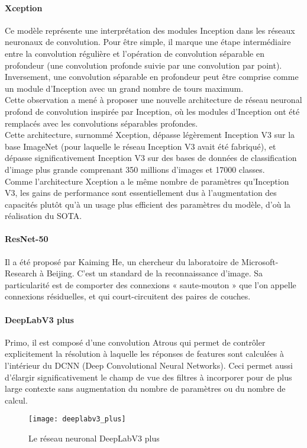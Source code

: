 \documentclass[
10pt, %
a4paper, %
oneside, %
headinclude,footinclude, %
]{scrartcl}
\begin{document}
\paragraph{Xception}
Ce modèle représente une interprétation des modules Inception dans les réseaux neuronaux de convolution. Pour être simple, il marque une étape intermédiaire entre la convolution régulière et l’opération de convolution séparable en profondeur\cite{cho2017xception} (une convolution profonde suivie par une convolution par point).
\\
Inversement, une convolution séparable en profondeur peut être comprise comme un module d’Inception avec un grand nombre de tours maximum.
\\
Cette observation a mené à proposer une nouvelle architecture de réseau neuronal profond de convolution inspirée par Inception, où les modules d’Inception ont été remplacés avec les convolutions séparables profondes.
\\
Cette architecture, surnommé Xception, dépasse légèrement Inception V3 sur la base ImageNet (pour laquelle le réseau Inception V3 avait été fabriqué), et dépasse significativement Inception V3 sur des bases de données de classification d’image plus grande comprenant 350 millions d’images et 17000 classes.
\\
Comme l’architecture Xception a le même nombre de paramètres qu’Inception V3, les gains de performance sont essentiellement dus à l’augmentation des capacités plutôt qu’à un usage plus efficient des paramètres du modèle, d’où la réalisation du SOTA.

\paragraph{ResNet-50}
Il a été proposé par Kaiming He, un chercheur du laboratoire de Microsoft-Research à Beijing. C’est un standard de la reconnaissance d’image. Sa particularité est de comporter des connexions « saute-mouton » que l’on appelle connexions résiduelles\cite{LeCun_2019_qlma}, et qui court-circuitent des paires de couches.
 
\paragraph{DeepLabV3 plus}
Primo, il est composé d’une convolution Atrous\cite{deeplabv3plus2018} qui permet de contrôler explicitement la résolution à laquelle les réponses de features sont calculées à l’intérieur du \gls{DCNN} (Deep Convolutional Neural Networks). Ceci permet aussi d’élargir significativement le champ de vue des filtres à incorporer pour de plus large contexte sans augmentation du nombre de paramètres ou du nombre de calcul.
\begin{figure}[htb]
\centering 
\texttt{[image: deeplabv3\_plus]} 
\caption[DeepLabV3 plus]{Le réseau neuronal DeepLabV3 plus} %
\label{fig:deeplabv3_plus} 
\end{figure}
\end{document}
